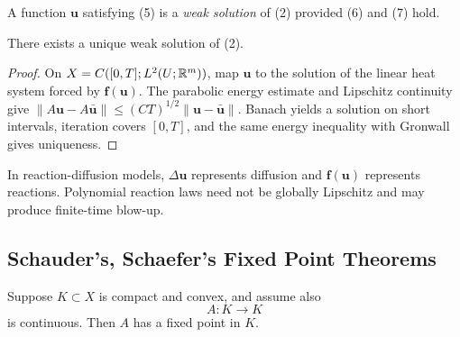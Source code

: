 \begin{definition}
\label{def:weak-solution-reaction-diffusion-system}

A function $\mathbf{u}$ satisfying (5) is a \textit{weak solution} of (2) provided (6) and (7) hold.
\end{definition}

\begin{theorem}
\label{thm:reaction-diffusion-banach-existence}

There exists a unique weak solution of (2).
\end{theorem}

\begin{proof}
\sketch On $X=C([0,T];L^2(U;\mathbb{R}^m))$, map $\mathbf u$ to the solution of the linear heat system forced by $\mathbf f(\mathbf u)$. The parabolic energy estimate and Lipschitz continuity give $\|A\mathbf u-A\bar{\mathbf u}\|\leq(CT)^{1/2}\|\mathbf u-\bar{\mathbf u}\|$. Banach yields a solution on short intervals, iteration covers $[0,T]$, and the same energy inequality with Gronwall gives uniqueness.
\end{proof}

\begin{remark}
\label{rem:reaction-diffusion-chemical-interpretation}

In reaction-diffusion models, $\Delta\mathbf u$ represents diffusion and $\mathbf f(\mathbf u)$ represents reactions. Polynomial reaction laws need not be globally Lipschitz and may produce finite-time blow-up.
\end{remark}

\subsection{Schauder's, Schaefer's Fixed Point Theorems}
\label{sec:schauder-schaefer-fixed-point-theorems}

\begin{theorem}
\label{thm:schauders-fixed-point-theorem}

Suppose $K \subset X$ is compact and convex, and assume also
\[
A : K \to K
\]
is continuous. Then $A$ has a fixed point in $K$.
\end{theorem}

